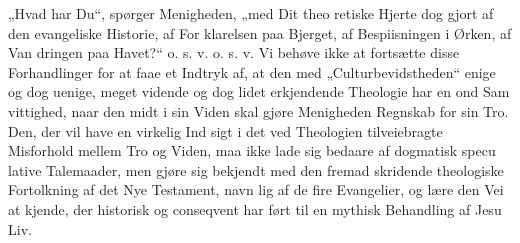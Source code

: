 \documentclass[12pt]{book}
\begin{document}
„Hvad har Du“, spørger Menigheden, „med Dit theo\-%
retiske Hjerte dog gjort af den evangeliske Historie, af For\-%
klarelsen paa Bjerget, af Bespiisningen i Ørken, af Van\-%
dringen paa Havet?“ o. s. v. o. s. v. Vi behøve ikke at
fortsætte disse Forhandlinger for at faae et Indtryk af, at
den med „Culturbevidstheden“ enige og dog uenige, meget
vidende og dog lidet erkjendende Theologie har en ond Sam\-%
vittighed, naar den midt i sin Viden skal gjøre Menigheden
Regnskab for sin Tro. Den, der vil have en virkelig Ind\-%
sigt i det ved Theologien tilveiebragte Misforhold mellem
Tro og Viden, maa ikke lade sig bedaare af dogmatisk specu\-%
lative Talemaader, men gjøre sig bekjendt med den fremad\-%
skridende theologiske Fortolkning af det Nye Testament, navn\-%
lig af de fire Evangelier, og lære den Vei at kjende, der
historisk og conseqvent har ført til en mythisk Behandling af
Jesu Liv.
\end{document}
